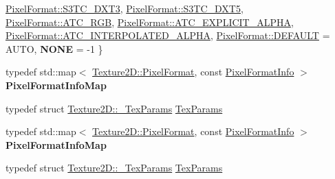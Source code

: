 \begin{DoxyCompactItemize}
\hyperlink{classTexture2D_a45d9d8bb5a0669def36bbdfbfb91d220a18afa393996c4f35141e45f74b3f19cd}{Pixel\+Format\+::\+S3\+T\+C\+\_\+\+D\+X\+T3}, 
\newline
\hyperlink{classTexture2D_a45d9d8bb5a0669def36bbdfbfb91d220a35accb284fb4482d04bc1cd507dfc2b5}{Pixel\+Format\+::\+S3\+T\+C\+\_\+\+D\+X\+T5}, 
\hyperlink{classTexture2D_a45d9d8bb5a0669def36bbdfbfb91d220afbfbadcc995ccea23d1d976ed36c794b}{Pixel\+Format\+::\+A\+T\+C\+\_\+\+R\+GB}, 
\hyperlink{classTexture2D_a45d9d8bb5a0669def36bbdfbfb91d220a50ba257f69441f6a76816a1a0a62c9b8}{Pixel\+Format\+::\+A\+T\+C\+\_\+\+E\+X\+P\+L\+I\+C\+I\+T\+\_\+\+A\+L\+P\+HA}, 
\hyperlink{classTexture2D_a45d9d8bb5a0669def36bbdfbfb91d220aaa2dec660ac790c7f1ac1802d073e38e}{Pixel\+Format\+::\+A\+T\+C\+\_\+\+I\+N\+T\+E\+R\+P\+O\+L\+A\+T\+E\+D\+\_\+\+A\+L\+P\+HA}, 
\newline
\hyperlink{classTexture2D_a45d9d8bb5a0669def36bbdfbfb91d220a5b39c8b553c821e7cddc6da64b5bd2ee}{Pixel\+Format\+::\+D\+E\+F\+A\+U\+LT} = A\+U\+TO, 
{\bfseries N\+O\+NE} = -\/1
 \}
\item 
\mbox{\label{classTexture2D_a4758bb235aa81bcb47bca36baf42be14}} 
typedef std\+::map$<$ \hyperlink{classTexture2D_a45d9d8bb5a0669def36bbdfbfb91d220}{Texture2\+D\+::\+Pixel\+Format}, const \hyperlink{structTexture2D_1_1PixelFormatInfo}{Pixel\+Format\+Info} $>$ {\bfseries Pixel\+Format\+Info\+Map}
\item 
typedef struct \hyperlink{structTexture2D_1_1__TexParams}{Texture2\+D\+::\+\_\+\+Tex\+Params} \hyperlink{classTexture2D_af2ea04a3dfcdf7274db17dda4bd555e3}{Tex\+Params}
\item 
\mbox{\label{classTexture2D_a4758bb235aa81bcb47bca36baf42be14}} 
typedef std\+::map$<$ \hyperlink{classTexture2D_a45d9d8bb5a0669def36bbdfbfb91d220}{Texture2\+D\+::\+Pixel\+Format}, const \hyperlink{structTexture2D_1_1PixelFormatInfo}{Pixel\+Format\+Info} $>$ {\bfseries Pixel\+Format\+Info\+Map}
\item 
typedef struct \hyperlink{structTexture2D_1_1__TexParams}{Texture2\+D\+::\+\_\+\+Tex\+Params} \hyperlink{classTexture2D_af2ea04a3dfcdf7274db17dda4bd555e3}{Tex\+Params}
\end{DoxyCompactItemize}
